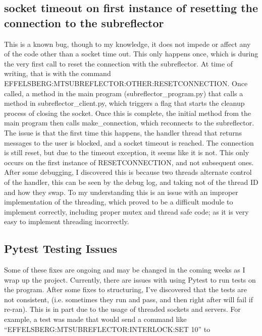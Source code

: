 \documentclass{article}
\begin{document}
\subsection{socket timeout on first instance of resetting the connection to the subreflector }

This is a known bug, though to my knowledge, it does not impede or affect any of the code other than a socket time out. This only happens once, which is during the very first call to reset the connection with the subreflector. At time of writing, that is with the command EFFELSBERG:MTSUBREFLECTOR:OTHER:RESETCONNECTION. Once called, a method in the main program (subreflector\_program.py) that 
calls a method in subreflector\_client.py, which triggers a flag that starts the cleanup process of closing the socket. Once this is complete, the initial method from the main program then calls make\_connection, which reconnects to the subreflector. The issue is that the first time this happens, the handler thread that returns messages to the user is blocked, and a socket timeout is reached. The connection is still reset, but due to the timeout exception, it seems like it is not. This only occurs on the first instance of RESETCONNECTION, and not subsequent ones. After some debugging, I discovered this is because two threads alternate control of the handler, this can be seen by the debug log, and taking not of the thread ID and how they swap. To my understanding this is an issue with an improper implementation of the threading, which proved to be a difficult module to implement correctly, including proper mutex and thread safe code; as it is very easy to implement threading incorrectly.

\subsection{Pytest Testing Issues}

Some of these fixes are ongoing and may be changed in the coming weeks as I wrap up the project. Currently, there are issues with using Pytest to run tests on the program. After some fixes to structuring, I've discovered that the tests are not consistent, (i.e. sometimes they run and pass, and then right after will fail if re-ran). This is in part due to the usage of threaded sockets and servers. For example, a test was made that would send a command like ``EFFELSBERG:MTSUBREFLECTOR:INTERLOCK:SET 10''  to 
\end{document}
